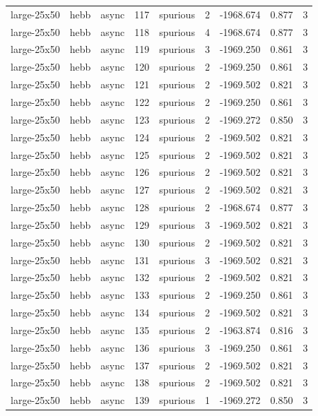 \begin{tabular}{lllrlrrrr}
large-25x50 & hebb & async & 117 & spurious & 2 & -1968.674 & 0.877 & 3 \\
large-25x50 & hebb & async & 118 & spurious & 4 & -1968.674 & 0.877 & 3 \\
large-25x50 & hebb & async & 119 & spurious & 3 & -1969.250 & 0.861 & 3 \\
large-25x50 & hebb & async & 120 & spurious & 2 & -1969.250 & 0.861 & 3 \\
large-25x50 & hebb & async & 121 & spurious & 2 & -1969.502 & 0.821 & 3 \\
large-25x50 & hebb & async & 122 & spurious & 2 & -1969.250 & 0.861 & 3 \\
large-25x50 & hebb & async & 123 & spurious & 2 & -1969.272 & 0.850 & 3 \\
large-25x50 & hebb & async & 124 & spurious & 2 & -1969.502 & 0.821 & 3 \\
large-25x50 & hebb & async & 125 & spurious & 2 & -1969.502 & 0.821 & 3 \\
large-25x50 & hebb & async & 126 & spurious & 2 & -1969.502 & 0.821 & 3 \\
large-25x50 & hebb & async & 127 & spurious & 2 & -1969.502 & 0.821 & 3 \\
large-25x50 & hebb & async & 128 & spurious & 2 & -1968.674 & 0.877 & 3 \\
large-25x50 & hebb & async & 129 & spurious & 3 & -1969.502 & 0.821 & 3 \\
large-25x50 & hebb & async & 130 & spurious & 2 & -1969.502 & 0.821 & 3 \\
large-25x50 & hebb & async & 131 & spurious & 3 & -1969.502 & 0.821 & 3 \\
large-25x50 & hebb & async & 132 & spurious & 2 & -1969.502 & 0.821 & 3 \\
large-25x50 & hebb & async & 133 & spurious & 2 & -1969.250 & 0.861 & 3 \\
large-25x50 & hebb & async & 134 & spurious & 2 & -1969.502 & 0.821 & 3 \\
large-25x50 & hebb & async & 135 & spurious & 2 & -1963.874 & 0.816 & 3 \\
large-25x50 & hebb & async & 136 & spurious & 3 & -1969.250 & 0.861 & 3 \\
large-25x50 & hebb & async & 137 & spurious & 2 & -1969.502 & 0.821 & 3 \\
large-25x50 & hebb & async & 138 & spurious & 2 & -1969.502 & 0.821 & 3 \\
large-25x50 & hebb & async & 139 & spurious & 1 & -1969.272 & 0.850 & 3 \\

\end{tabular}
